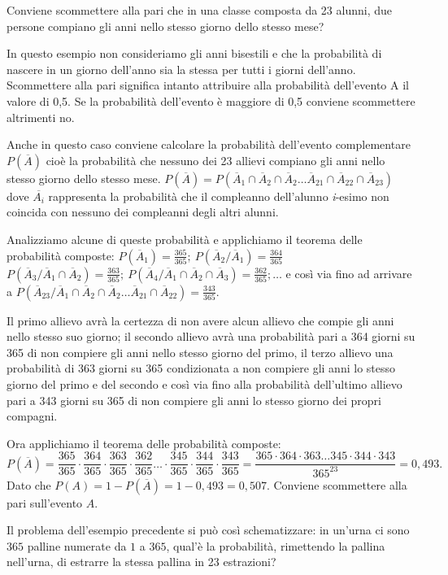 \begin{exrig}
\begin{esempio}
Conviene scommettere alla pari che in una classe composta da 23 alunni, due 
persone compiano gli anni nello stesso giorno dello stesso mese?

In questo esempio non consideriamo gli anni bisestili e che la probabilità di 
nascere in un giorno dell'anno sia la stessa per tutti i giorni dell'anno. 
Scommettere alla pari significa intanto attribuire alla probabilità dell'evento 
A il valore di 0,5. Se la probabilità dell'evento è maggiore di 0,5 conviene 
scommettere altrimenti no.

Anche in questo caso conviene calcolare la probabilità dell'evento complementare 
$P(\overline A)$ cioè la probabilità che nessuno dei 23 allievi compiano gli 
anni nello stesso giorno dello stesso mese. $P(\overline A)=P(\overline A_1\cap 
\overline A_2\cap \overline A_2\ldots \overline A_{21}\cap \overline A_{22}\cap 
\overline A_{23})$ dove $\overline{A_i}$ rappresenta la probabilità che il 
compleanno dell'alunno \emph{i}{}-esimo non coincida con nessuno dei compleanni 
degli altri alunni.

Analizziamo alcune di queste probabilità e applichiamo il teorema delle 
probabilità composte: $P(\overline A_1)=\frac{365}{365};\ P(\overline 
A_2/\overline A_1)=\frac{364}{365}$ $P(\overline A_3/\overline A_1\cap \overline 
A_2)=\frac{363}{365};\ P(\overline A_4/\overline A_1\cap \overline A_2\cap 
\overline A_3)=\frac{362}{365};\ldots $ e così via fino ad arrivare a 
$P(\overline A_{23}/\overline A_1\cap \overline A_2\cap \overline A_2\ldots 
\overline A_{21}\cap \overline A_{22})=\frac{343}{365}$.

Il primo allievo avrà la certezza di non avere alcun allievo che compie gli anni 
nello stesso suo giorno; il secondo allievo avrà una probabilità pari a 364 
giorni su 365 di non compiere gli anni nello stesso giorno del primo, il terzo 
allievo una probabilità di 363 giorni su 365 condizionata a non compiere gli 
anni lo stesso giorno del primo e del secondo e così via fino alla probabilità 
dell'ultimo allievo pari a 343 giorni su 365 di non compiere gli anni lo stesso 
giorno dei propri compagni.

Ora applichiamo il teorema delle probabilità composte: \[ P(\overline 
A)=\frac{365}{365}\cdot \frac{364}{365}\cdot \frac{363}{365}\cdot 
\frac{362}{365}\ldots \cdot \frac{345}{365}\cdot \frac{344}{365}\cdot 
\frac{343}{365}=\frac{365\cdot 364\cdot 363\ldots 345 \cdot 344\cdot 
343}{365^{23}}=0,493. \] Dato che $P(A)=1-P(\overline A)=1-0,493=0,507$.
\conclusione Conviene scommettere alla pari sull'evento $ A $.
\end{esempio}
\end{exrig}
Il problema dell'esempio precedente si può così schematizzare: in un'urna ci 
sono $ 365 $ palline numerate da $ 1 $ a $ 365 $, qual'è la probabilità, 
rimettendo la pallina nell'urna, di estrarre la stessa pallina in 23 estrazioni?

